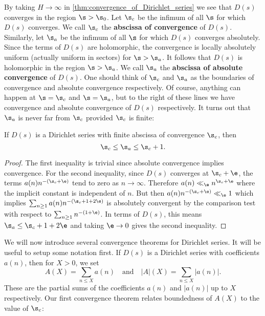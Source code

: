     By taking $H \to \infty$ in \cref{thm:convergence_of_Dirichlet_series} we see that $D(s)$ converges in the region $\s > \s_{0}$. Let $\s_{c}$ be the infimum of all $\s$ for which $D(s)$ converges. We call $\s_{c}$ the \textbf{abscissa of convergence} of $D(s)$. Similarly, let $\s_{a}$ be the infimum of all $\s$ for which $D(s)$ converges absolutely. Since the terms of $D(s)$ are holomorphic, the convergence is locally absolutely uniform (actually uniform in sectors) for $\s > \s_{a}$. It follows that $D(s)$ is holomorphic in the region $\s > \s_{a}$.  We call $\s_{a}$ the \textbf{abscissa of absolute convergence} of $D(s)$. One should think of $\s_{c}$ and $\s_{a}$ as the boundaries of convergence and absolute convergence respectively. Of course, anything can happen at $\s = \s_{c}$ and $\s = \s_{a}$, but to the right of these lines we have convergence and absolute convergence of $D(s)$ respectively. It turns out that $\s_{a}$ is never far from $\s_{c}$ provided $\s_{c}$ is finite:

    \begin{theorem}
      If $D(s)$ is a Dirichlet series with finite abscissa of convergence $\s_{c}$, then
      \[
        \s_{c} \le \s_{a} \le \s_{c}+1.
      \]
    \end{theorem}
    \begin{proof}
      The first inequality is trivial since absolute convergence implies convergence. For the second inequality, since $D(s)$ converges at $\s_{c}+\e$, the terms $a(n)n^{-(\s_{c}+\e)}$ tend to zero as $n \to \infty$. Therefore $a(n) \ll_{\e} n^{\s_{c}+\e}$ where the implicit constant is independent of $n$. But then $a(n)n^{-(\s_{c}+\e)} \ll_{\e} 1$ which implies $\sum_{n \ge 1}a(n)n^{-(\s_{c}+1+2\e)}$ is absolutely convergent by the comparison test with respect to $\sum_{n \ge 1}n^{-(1+\e)}$. In terms of $D(s)$, this means $\s_{a} \le \s_{c}+1+2\e$ and taking $\e \to 0$ gives the second inequality.
    \end{proof}

    We will now introduce several convergence theorems for Dirichlet series. It will be useful to setup some notation first. If $D(s)$ is a Dirichlet series with coefficients $a(n)$, then for $X > 0$, we set
    \[
      A(X) = \sum_{n \le X}a(n) \quad \text{and} \quad |A|(X) = \sum_{n \le X}|a(n)|.
    \]
    These are the partial sums of the coefficients $a(n)$ and $|a(n)|$ up to $X$ respectively. Our first convergence theorem relates boundedness of $A(X)$ to the value of $\s_{c}$: 
    
